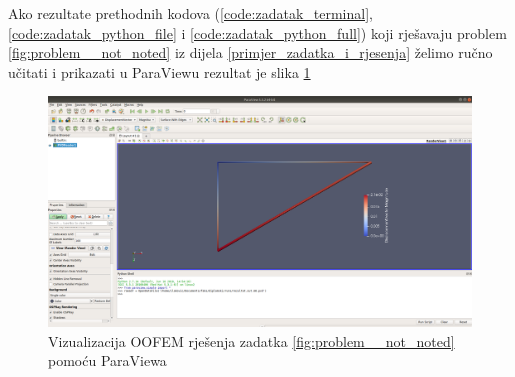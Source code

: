 \documentclass[a4paper,twoside,12pt]{memoir} %
\begin{document}


Ako rezultate prethodnih kodova (\ref{code:zadatak_terminal}, \ref{code:zadatak_python_file} i \ref{code:zadatak_python_full}) koji rješavaju problem \ref{fig:problem__not_noted} iz dijela \ref{primjer_zadatka_i_rjesenja} želimo ručno učitati i prikazati u ParaViewu rezultat je slika \ref{fig:visualization_of_zadatak_paraview}

\begin{figure}[h!t]
\begin{center}
\includegraphics[scale=0.21]{pictures/chapter_zadatak/paraview_zadatak.png}
\caption{Vizualizacija OOFEM rješenja zadatka \ref{fig:problem__not_noted} pomoću ParaViewa}
\label{fig:visualization_of_zadatak_paraview}
\end{center}
\end{figure}





\pagestyle{empty} %

\end{document}
